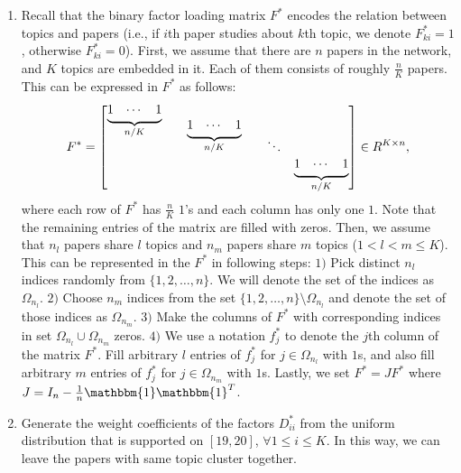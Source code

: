 \documentclass[AMS,STIX1COL]{WileyNJD-v2}
\newcommand{\block}[1]{
  \underbrace{\begin{matrix}1 & \cdots & 1\end{matrix}}_{#1}
}
\begin{document}
{\begin{enumerate}
    \item Recall that the binary factor loading matrix $F^*$ encodes the relation between topics and papers
        (i.e., if $i$th paper studies about $k$th topic, we denote $F^*_{ki}=1$, otherwise $F^*_{ki}=0$).
        First, we assume that there are $n$ papers in the network, and $K$ topics are embedded in it.
        Each of them consists of roughly $\frac{n}{K}$ papers.
        This can be expressed in $F^*$ as follows:
        \[
            F^* =
               \begin{bmatrix}
                 \smash[b]{\block{n/K}} \\
                 && \smash[b]{\block{n/K}} \\
                 &&&& \ddots \\
                 &&&&& \block{n/K}
                \end{bmatrix}
              \in R^{K \times n},
        \]
        where each row of $F^*$ has $\frac{n}{K}$ $1$'s and each column has only one $1$.
        Note that the remaining entries of the matrix are filled with zeros.
        Then, we assume that $n_{l}$ papers share $l$ topics and $n_{m}$ papers share $m$ topics ($1 < l < m \leq K$).
        This can be represented in the $F^*$ in following steps:
        $1)$ Pick distinct $n_{l}$ indices randomly from $\{1,2,\dots,n\}$.
        We will denote the set of the indices as $\Omega_{n_l}$.
        $2)$ Choose $n_{m}$ indices from the set $\{1,2,\dots,n\}\setminus \Omega_{n_{l}}$ and denote the set of those indices as $\Omega_{n_{m}}$.
        $3)$ Make the columns of $F^*$ with corresponding indices in set $\Omega_{n_{l}} \cup \Omega_{n_{m}}$ zeros.
        $4)$ We use a notation $f^*_j$ to denote the $j$th column of the matrix $F^*$.
        Fill arbitrary $l$ entries of $f^*_j$ for $j \in \Omega_{n_l}$ with $1$s, and also fill arbitrary $m$ entries of $f^*_j$ for $j \in \Omega_{n_m}$ with $1$s.
        Lastly, we set $F^*=JF^*$ where $J=I_{n}-\frac{1}{n}\mathbbm{1}\mathbbm{1}^T$.

    \item Generate the weight coefficients of the factors $D^*_{ii}$ from the uniform distribution that is supported on $[19,20]$, $ \forall 1 \leq i \leq K$.
        In this way, we can leave the papers with same topic cluster together.


\end{enumerate}}
\end{document}
